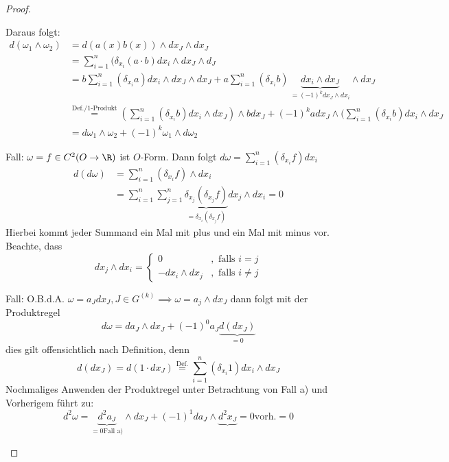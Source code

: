 \begin{theorem}[Satz]
\begin{proof}
\begin{enum-arab}
      \item
Daraus folgt:
\begin{align*}
d(\omega_1 \land \omega_2)&=d(a(x) b(x))\wedge dx_J \wedge dx_J\\
&= \sum_{i=1}^n(\delta_{x_i}(a\cdot b) dx_i \wedge dx_J \wedge d_J\\
&= b\sum_{i=1}^n(\delta_{x_i} a) dx_i \wedge dx_J \wedge dx_J + a \sum_{i=1}^n (\delta_{x_i} b)\, \underbrace{dx_i \wedge dx_J}_{=(-1)^k dx_J \wedge dx_i}  \wedge dx_J \\
&\stackrel{\text{Def./1-Produkt}}=(\sum_{i=1}^n(\delta_{x_i}b) dx_i \wedge dx_J)\wedge bdx_J + (-1)^k a dx_J \wedge(\sum_{i=1}^n(\delta_{x_i} b) dx_i \wedge dx_J \\
&= d\omega_1 \wedge \omega_2+(-1)^k \omega_1 \wedge d\omega_2
\end{align*}
\item 
\begin{enum-alph}
\item Fall: $\omega=f\in C^2(O\to \R)$ ist $O$-Form. Dann folgt $d\omega=\sum_{i=1}^n (\delta_{x_i} f)dx_i$
\begin{align*}
d(d\omega)&=\sum_{i=1}^n (\delta_{x_i} f)\wedge dx_i\\
&= \sum_{i=1}^n \sum_{j=1}^n \underbrace{\delta_{x_j}(\delta_{x_j}f)}_{=\delta_{x_i}(\delta_{x_j} f)} dx_j  \wedge dx_i = 0
\end{align*}
Hierbei kommt jeder Summand ein Mal mit plus und ein Mal mit minus vor. Beachte, dass
\[
dx_j\wedge dx_i=\begin{cases} 0 &, \text{ falls } i=j\\ -dx_i\wedge dx_j &,\text{ falls } i\neq j\end{cases}
\]
\item Fall: O.B.d.A. $\omega=a_J dx_J, J \in G^{(k)} \implies \omega=a_j\wedge dx_J$
dann folgt mit der Produktregel
\[
d\omega=da_J \wedge dx_J+(-1)^0 a_J \underbrace{d(dx_J)}_{=0}
\]
dies gilt offensichtlich nach Definition, denn
\[
d(dx_J)=d(1\cdot dx_J)\stackrel{\text{Def.}}=\sum_{i=1}^n(\delta_{x_i} 1) dx_i \wedge dx_J
\]
Nochmaliges Anwenden der Produktregel unter Betrachtung von Fall a) und Vorherigem führt zu:
\[
d^2\omega=\underbrace{d^2 a_J}_{=0 \text{Fall a)}} \wedge dx_J+(-1)^1 da_J \wedge \underbrace{d^2x_J}{=0 \text{vorh.}}=0
\]
\end{enum-alph}
    \end{enum-arab}
  \end{proof}
\end{theorem}


